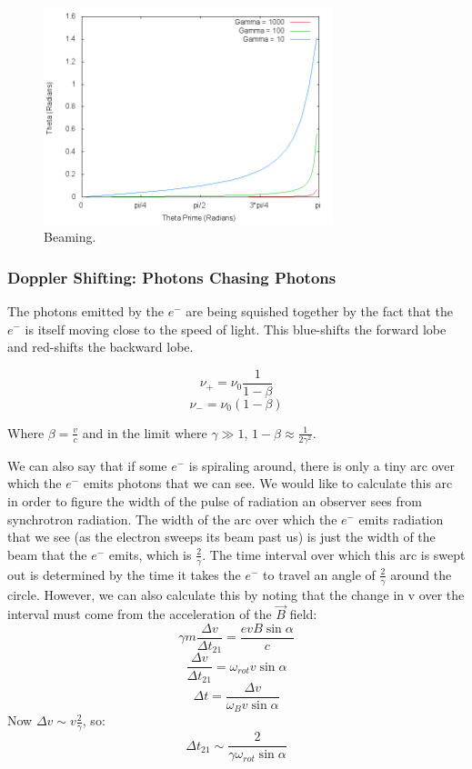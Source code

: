 \documentclass{article}
\begin{document}
\begin{figure}
    \centering
    \includegraphics[width=0.75\textwidth]{Beam.png}
    \caption{Beaming.}
    \label{fig:beam}
\end{figure}

\subsubsection{Doppler Shifting: Photons Chasing Photons
}

The photons emitted by the $e^-$ are being squished together by the fact that
the $e^-$ is itself moving close to the speed of light. This blue-shifts the forward lobe and red-shifts the backward lobe.

$$\nu_+ = \nu_0 \frac{1}{ 1-\beta}$$
$$\nu_- = \nu_0 (1-\beta)$$

Where $\beta = \frac{v}{ c}$ and in the limit where $\gamma\gg1$, $1 - \beta \approx \frac{1}{ 2\gamma^2}$.

We can also say that if some $e^-$ is
spiraling around, there is only a tiny arc over which the $e^-$ emits
photons that we can see.  We would like to calculate this arc in order to
figure the width of the pulse of radiation an observer sees from synchrotron
radiation.  The width of the arc over which the $e^-$ emits radiation that
we see (as the electron sweeps its beam past us) is just the width of the
beam that the $e^-$ emits, which is $\frac{2}{\gamma}$.  The time interval
over which this arc is swept out is determined by the time it takes the
$e^-$ to travel an angle of $\frac{2}{\gamma}$ around the circle.  However, we can
also calculate this by noting that the change in v over the interval must
come from the acceleration of the $\vec B$ field:
$$\gamma m\frac{\Delta v}{\Delta t_{21}}=\frac{evB\sin\alpha}{ c}$$
$$\frac{\Delta v}{\Delta t_{21}}=\omega_{rot}v\sin\alpha$$
$$\Delta t=\frac{\Delta v}{ \omega_B v\sin\alpha}$$
Now $\Delta v\sim v\frac{2}{\gamma}$, so:
$$\boxed{\Delta t_{21}\sim\frac{2}{\gamma\omega_{rot}\sin\alpha}}$$
\end{document}
